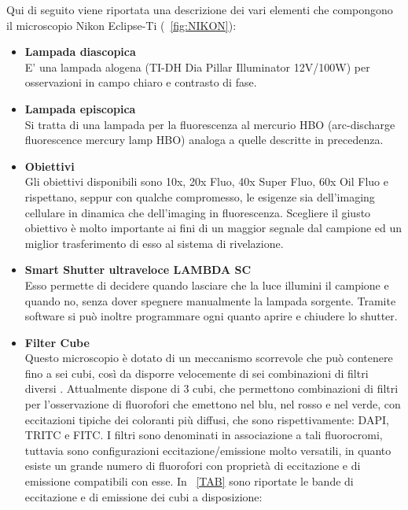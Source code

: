Qui di seguito viene riportata una descrizione dei vari elementi che compongono il microscopio Nikon Eclipse-Ti (\figurename~\ref{fig:NIKON}):

\begin{itemize}

\item \textbf{Lampada diascopica}\\
E' una lampada alogena (TI-DH Dia Pillar Illuminator 12V/100W) per osservazioni in campo chiaro e contrasto di fase.

\item \textbf{Lampada episcopica} \\
Si tratta di una lampada per la fluorescenza al mercurio HBO (arc-discharge fluorescence mercury lamp HBO) analoga a quelle descritte in precedenza.

\item \textbf{Obiettivi}\\
Gli obiettivi disponibili sono 10x, 20x Fluo, 40x Super Fluo, 60x Oil Fluo e rispettano, seppur con qualche compromesso, le esigenze sia dell'imaging cellulare in dinamica che dell'imaging in fluorescenza. 
Scegliere il giusto obiettivo è molto importante ai fini di un maggior segnale dal campione ed un miglior trasferimento di esso al sistema di rivelazione.

\item \textbf{Smart Shutter ultraveloce LAMBDA SC}\\
Esso permette di decidere quando lasciare che la luce illumini il campione e quando no, senza dover spegnere manualmente la lampada sorgente.
Tramite software si può inoltre programmare ogni quanto aprire e chiudere lo shutter.

\item \textbf{Filter Cube}\\
Questo microscopio è dotato di un meccanismo scorrevole che può contenere fino a sei cubi, così da disporre velocemente di sei combinazioni di filtri diversi \cite{Nikon1}. 
Attualmente dispone di 3 cubi, che permettono combinazioni di filtri per l'osservazione di fluorofori che emettono nel blu, nel rosso e nel verde, con eccitazioni tipiche dei coloranti più diffusi, che sono rispettivamente: DAPI, TRITC e FITC. 
I filtri sono denominati in associazione a tali fluorocromi, tuttavia sono configurazioni eccitazione/emissione molto versatili, in quanto esiste un grande numero di fluorofori con proprietà di eccitazione e di emissione compatibili con esse. 
In \tablename~\ref{TAB} sono riportate le bande di eccitazione e di emissione dei cubi a disposizione:


\end{itemize}

